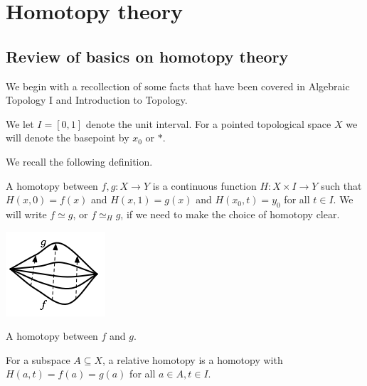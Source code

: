 \documentclass[ma3408.tex]{subfiles}
\begin{document}
\chapter{Homotopy theory}
\section{Review of basics on homotopy theory}
We begin with a recollection of some facts that have been covered in Algebraic Topology I and Introduction to Topology. 
\begin{Not}
We let $I = [0,1]$ denote the unit interval. For a pointed topological space $X$ we will denote the basepoint by $x_0$ or $\ast$. 
\end{Not}
We recall the following definition. 
\begin{Def}
	A homotopy between $f,g \colon X \to Y$ is a continuous function $H \colon X \times I \to Y$ such that $H(x,0) = f(x)$ and $H(x,1) = g(x)$ and $H(x_0,t) = y_0$ for all $t \in I$. We will write $f \simeq g$, or $f \simeq_H g$, if we need to make the choice of homotopy clear. \begin{marginfigure} \centering\includegraphics[scale = 0.5]{path_homotopy}\caption{A homotopy between $f$ and $g$.}\label{fig:homotopy}\end{marginfigure}

	For a subspace $A \subseteq X$, a relative homotopy is a homotopy with $H(a,t) = f(a) = g(a)$ for all $a \in A, t \in I$. 
	\end{Def}
\end{document}
